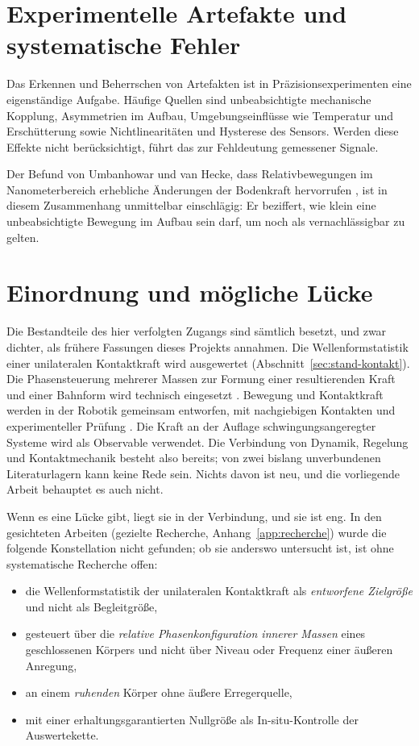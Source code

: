 \documentclass[12pt,a4paper]{report}
\begin{document}
\section{Experimentelle Artefakte und systematische Fehler}

Das Erkennen und Beherrschen von Artefakten ist in Präzisionsexperimenten
eine eigenständige Aufgabe. Häufige Quellen sind unbeabsichtigte
mechanische Kopplung, Asymmetrien im Aufbau, Umgebungseinflüsse wie
Temperatur und Erschütterung sowie Nichtlinearitäten und Hysterese des
Sensors. Werden diese Effekte nicht berücksichtigt, führt das zur
Fehldeutung gemessener Signale.

Der Befund von Umbanhowar und van Hecke, dass Relativbewegungen im
Nanometerbereich erhebliche Änderungen der Bodenkraft hervorrufen
\cite{umbanhowar2005}, ist in diesem Zusammenhang unmittelbar
einschlägig: Er beziffert, wie klein eine unbeabsichtigte Bewegung im
Aufbau sein darf, um noch als vernachlässigbar zu gelten.

\section{Einordnung und mögliche Lücke}

Die Bestandteile des hier verfolgten Zugangs sind sämtlich besetzt, und
zwar dichter, als frühere Fassungen dieses Projekts annahmen. Die
Wellenformstatistik einer unilateralen Kontaktkraft wird ausgewertet
(Abschnitt~\ref{sec:stand-kontakt}). Die Phasensteuerung mehrerer Massen
zur Formung einer resultierenden Kraft und einer Bahnform wird technisch
eingesetzt \cite{chen2019, osadchyy2023, gurskyi2023}. Bewegung und
Kontaktkraft werden in der Robotik gemeinsam entworfen, mit nachgiebigen
Kontakten und experimenteller Prüfung
\cite{chatzinikolaidis2020, chatzinikolaidis2021}. Die Kraft an der
Auflage schwingungsangeregter Systeme wird als Observable verwendet. Die
Verbindung von Dynamik, Regelung und Kontaktmechanik besteht also
bereits; von zwei bislang unverbundenen Literaturlagern kann keine Rede
sein. Nichts davon ist neu, und die vorliegende Arbeit behauptet es
auch nicht.

Wenn es eine Lücke gibt, liegt sie in der Verbindung, und sie ist eng.
In den gesichteten Arbeiten (gezielte Recherche, Anhang~\ref{app:recherche})
wurde die folgende Konstellation nicht gefunden; ob sie anderswo
untersucht ist, ist ohne systematische Recherche offen:

\begin{itemize}
\item die Wellenformstatistik der unilateralen Kontaktkraft als
      \emph{entworfene Zielgröße} und nicht als Begleitgröße,
\item gesteuert über die \emph{relative Phasenkonfiguration innerer
      Massen} eines geschlossenen Körpers und nicht über Niveau oder
      Frequenz einer äußeren Anregung,
\item an einem \emph{ruhenden} Körper ohne äußere Erregerquelle,
\item mit einer erhaltungsgarantierten Nullgröße als
      In-situ-Kontrolle der Auswertekette.
\end{itemize}
\end{document}
